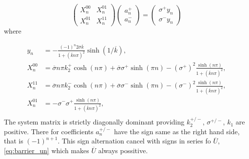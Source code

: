 \documentclass[a4paper,10pt]{article}
\def\ol#1{\overline{#1}}
\begin{document}
\begin{equation}
    \label{eq:an_system}
    \begin{pmatrix} 
            X_n^{00} & X_n^{01} \\ 
            X_n^{01} & X_n^{11}
    \end{pmatrix}
    \begin{pmatrix} 
        a_n^+  \\ 
        a_n^-     
    \end{pmatrix}
     =  
    \begin{pmatrix} 
        \sigma^{+}y_n \\ 
        \sigma^{-}y_n
    \end{pmatrix}
\end{equation}
where
% 

\begin{align}
    \label{eq:yn}    
    y_n     &= -\frac{(-1)^n 2 \ol{\sigma}\ol{k}}{1+(\ol{k} n \pi)^2}\sinh(1/\ol{k}), \\
    X_n^{00}  &= \ol{\sigma}n \pi k_2^+\cosh(n \pi) 
              + \ol{\sigma}\sigma^+\sinh(\pi n)  - (\sigma^+)^2 \frac{\sinh(n \pi)}{1 + (\ol{k} n \pi)^2}, \\    
    X_n^{11}  &= \ol{\sigma}n \pi k_2^-  \cosh(n \pi) 
              + \ol{\sigma}\sigma^-\sinh(\pi n)    - (\sigma^-)^2 \frac{\sinh(n \pi)}{1 + (\ol{k} n \pi)^2}, \\
    X_n^{01}  &= -\sigma^- \sigma^+\frac{\sinh(n \pi)}{1 + (\ol{k} n \pi)^2}, \\    
\end{align}
The system matrix is strictly diagonally dominant providing $k_2^{+/-}$, $\sigma^{+/-}$, $k_1$ are positive.
There for coefficients $a_n^{+/-}$ have the sign same as the right hand side, that is $(-1)^{n+1}$. This sign
alternation cancel with signs in series fo $\ol{U}$, \eqref{eq:barrier_un} which makes $\ol{U}$ always possitive.
\end{document}

